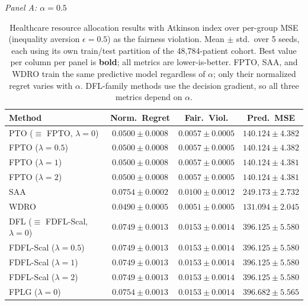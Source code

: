 \begin{table}[htbp]
\centering
\caption{Healthcare resource allocation results with Atkinson index over per-group MSE (inequality aversion $\epsilon=0.5$) as the fairness violation. Mean $\pm$ std.\ over 5 seeds, each using its own train/test partition of the 48{,}784-patient cohort. Best value per column per panel is \textbf{bold}; all metrics are lower-is-better. FPTO, SAA, and WDRO train the same predictive model regardless of $\alpha$; only their normalized regret varies with $\alpha$. DFL-family methods use the decision gradient, so all three metrics depend on $\alpha$.}
\label{tab:healthcare-atk}
\footnotesize
\setlength{\tabcolsep}{5pt}

\smallskip
\textit{Panel A: $\alpha = 0.5$}

\smallskip
\begin{tabular}{l ccc}
\toprule
Method & Norm.\ Regret & Fair.\ Viol. & Pred.\ MSE \\
\midrule
PTO ($\equiv$ FPTO, $\lambda\!=\!0$)         & $0.0500 \pm 0.0008$ & $0.0057 \pm 0.0005$ & $140.124 \pm 4.382$ \\
FPTO ($\lambda\!=\!0.5$)                     & $0.0500 \pm 0.0008$ & $0.0057 \pm 0.0005$ & $140.124 \pm 4.382$ \\
FPTO ($\lambda\!=\!1$)                       & $0.0500 \pm 0.0008$ & $0.0057 \pm 0.0005$ & $140.124 \pm 4.381$ \\
FPTO ($\lambda\!=\!2$)                       & $0.0500 \pm 0.0008$ & $0.0057 \pm 0.0005$ & $140.124 \pm 4.381$ \\
\midrule
SAA                                          & $0.0754 \pm 0.0002$ & $0.0100 \pm 0.0012$ & $249.173 \pm 2.732$ \\
WDRO                                         & $\mathbf{0.0490 \pm 0.0005}$ & $\mathbf{0.0051 \pm 0.0005}$ & $\mathbf{131.094 \pm 2.045}$ \\
\midrule
DFL ($\equiv$ FDFL-Scal, $\lambda\!=\!0$)    & $0.0749 \pm 0.0013$ & $0.0153 \pm 0.0014$ & $396.125 \pm 5.580$ \\
FDFL-Scal ($\lambda\!=\!0.5$)                & $0.0749 \pm 0.0013$ & $0.0153 \pm 0.0014$ & $396.125 \pm 5.580$ \\
FDFL-Scal ($\lambda\!=\!1$)                  & $0.0749 \pm 0.0013$ & $0.0153 \pm 0.0014$ & $396.125 \pm 5.580$ \\
FDFL-Scal ($\lambda\!=\!2$)                  & $0.0749 \pm 0.0013$ & $0.0153 \pm 0.0014$ & $396.125 \pm 5.580$ \\
\midrule
FPLG ($\lambda\!=\!0$)                       & $0.0754 \pm 0.0013$ & $0.0153 \pm 0.0014$ & $396.682 \pm 5.565$ \\

\end{tabular}
\end{table}
